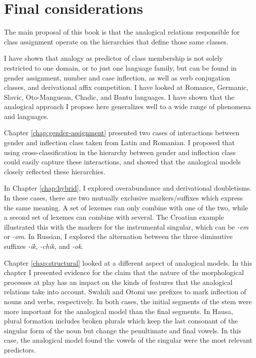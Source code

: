 \section{Final considerations}

The main proposal of this book is that the analogical relations responsible for class assignment operate on the hierarchies that define those same classes.

I have shown that analogy as predictor of  class membership is not solely restricted to one domain, or to just one language family, but can be found in gender assignment, number and case inflection, as well as verb conjugation classes, and derivational affix competition.
I have looked at Romance, Germanic, Slavic, Oto-Manguean, Chadic, and Bantu languages. I have shown that the analogical approach I propose here generalizes well to a wide range of phenomena and languages.

Chapter \ref{chap:gender-assignment} presented two cases of interactions between gender and inflection class taken from Latin and Romanian.
I proposed that using cross-classification in the hierarchy between gender and inflection class could easily capture these interactions, and showed that the analogical models closely reflected these hierarchies.

In Chapter \ref{chap:hybrid}, I explored overabundance and derivational doubletisms.
In these cases, there are two mutually exclusive markers/suffixes which express the same meaning. A set of lexemes can only combine with one of the two, while a second set of lexemes can combine with several.
The Croatian example illustrated this with the markers for the instrumental singular, which can be \textit{-em} or \textit{-om}.
In Russian, I explored the alternation between the three diminutive suffixes \textit{-ik}, \textit{-chik}, and \textit{-ok}.

Chapter \ref{chap:structural} looked at a different aspect of analogical models. In this chapter I presented evidence for the claim that the nature of the morphological processes at play has an impact on the kinds of features that the analogical relations take into account.
Swahili and Otomi use prefixes to mark inflection of nouns and verbs, respectively.
In both cases, the initial segments of the stem were more important for the analogical model than the final segments.
In Hausa, plural formation includes broken plurals which keep the last consonant of the singular form of the noun but change the penultimate and final vowels.
In this case, the analogical model found the vowels of the singular were the most relevant predictors.

